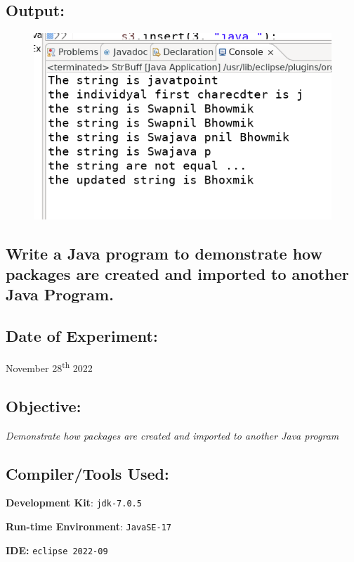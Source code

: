 \documentclass[12pt, a4paper]{article}
\begin{document}
\subsection*{Output:}
\begin{figure}[h]
  \centering
  \includegraphics[width=\textwidth]{strbuff}
\end{figure}
\newpage

\begin{tcolorbox}
\section{Write a Java program to demonstrate how packages are created and imported to another Java Program.}
\end{tcolorbox}

\subsection*{Date of Experiment:}
November 28\textsuperscript{th} 2022

\subsection*{Objective:}
\emph{\large{Demonstrate how packages are created and imported to another Java program}}

\subsection*{Compiler/Tools Used:}
\textbf{Development Kit}: \verb+jdk-7.0.5+

\textbf{Run-time Environment}: \verb+JavaSE-17+

\textbf{IDE:} \verb+eclipse 2022-09+
\end{document}

